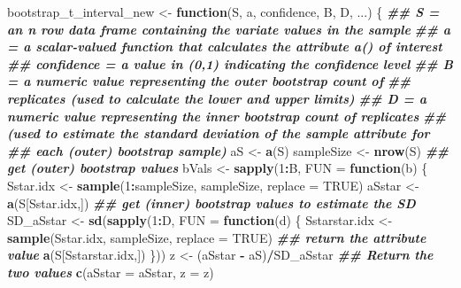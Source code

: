\documentclass[
]{article}
\newenvironment{Shaded}{\begin{snugshade}}{\end{snugshade}}
\newcommand{\AttributeTok}[1]{\textcolor[rgb]{0.13,0.29,0.53}{#1}}
\newcommand{\ConstantTok}[1]{\textcolor[rgb]{0.56,0.35,0.01}{#1}}
\newcommand{\ControlFlowTok}[1]{\textcolor[rgb]{0.13,0.29,0.53}{\textbf{#1}}}
\newcommand{\DecValTok}[1]{\textcolor[rgb]{0.00,0.00,0.81}{#1}}
\newcommand{\DocumentationTok}[1]{\textcolor[rgb]{0.56,0.35,0.01}{\textbf{\textit{#1}}}}
\newcommand{\FunctionTok}[1]{\textcolor[rgb]{0.13,0.29,0.53}{\textbf{#1}}}
\newcommand{\NormalTok}[1]{#1}
\newcommand{\OtherTok}[1]{\textcolor[rgb]{0.56,0.35,0.01}{#1}}
\newcommand{\SpecialCharTok}[1]{\textcolor[rgb]{0.81,0.36,0.00}{\textbf{#1}}}
\begin{document}
\newpage

\begin{Shaded}
\begin{Highlighting}[]
\NormalTok{bootstrap\_t\_interval\_new }\OtherTok{\textless{}{-}} \ControlFlowTok{function}\NormalTok{(S, a, confidence, B, D, ...) \{}
  \DocumentationTok{\#\#    S = an n row data frame containing the variate values in the sample }
  \DocumentationTok{\#\#    a = a scalar{-}valued function that calculates the attribute a() of interest }
  \DocumentationTok{\#\#    confidence = a value in (0,1) indicating the confidence level }
  \DocumentationTok{\#\#    B = a numeric value representing the outer bootstrap count of}
  \DocumentationTok{\#\#    replicates (used to calculate the lower and upper limits) }
  \DocumentationTok{\#\#    D = a numeric value representing the inner bootstrap count of replicates}
  \DocumentationTok{\#\#    (used to estimate the standard deviation of the sample attribute for}
  \DocumentationTok{\#\#    each (outer) bootstrap sample)}
\NormalTok{  aS }\OtherTok{\textless{}{-}} \FunctionTok{a}\NormalTok{(S)}
\NormalTok{  sampleSize }\OtherTok{\textless{}{-}} \FunctionTok{nrow}\NormalTok{(S)}
  \DocumentationTok{\#\# get (outer) bootstrap values}
\NormalTok{  bVals }\OtherTok{\textless{}{-}} \FunctionTok{sapply}\NormalTok{(}\DecValTok{1}\SpecialCharTok{:}\NormalTok{B, }\AttributeTok{FUN =} \ControlFlowTok{function}\NormalTok{(b) \{}
\NormalTok{    Sstar.idx }\OtherTok{\textless{}{-}} \FunctionTok{sample}\NormalTok{(}\DecValTok{1}\SpecialCharTok{:}\NormalTok{sampleSize, sampleSize, }\AttributeTok{replace =} \ConstantTok{TRUE}\NormalTok{)}
\NormalTok{    aSstar }\OtherTok{\textless{}{-}} \FunctionTok{a}\NormalTok{(S[Sstar.idx,])}
    \DocumentationTok{\#\# get (inner) bootstrap values to estimate the SD}
\NormalTok{    SD\_aSstar }\OtherTok{\textless{}{-}} \FunctionTok{sd}\NormalTok{(}\FunctionTok{sapply}\NormalTok{(}\DecValTok{1}\SpecialCharTok{:}\NormalTok{D, }\AttributeTok{FUN =} \ControlFlowTok{function}\NormalTok{(d) \{}
\NormalTok{      Sstarstar.idx }\OtherTok{\textless{}{-}} \FunctionTok{sample}\NormalTok{(Sstar.idx, sampleSize, }\AttributeTok{replace =} \ConstantTok{TRUE}\NormalTok{)}
      \DocumentationTok{\#\# return the attribute value}
      \FunctionTok{a}\NormalTok{(S[Sstarstar.idx,])}
\NormalTok{    \}))}
\NormalTok{    z }\OtherTok{\textless{}{-}}\NormalTok{ (aSstar }\SpecialCharTok{{-}}\NormalTok{ aS)}\SpecialCharTok{/}\NormalTok{SD\_aSstar}
    \DocumentationTok{\#\# Return the two values}
    \FunctionTok{c}\NormalTok{(}\AttributeTok{aSstar =}\NormalTok{ aSstar, }\AttributeTok{z =}\NormalTok{ z)}

\end{Highlighting}
\end{Shaded}
\end{document}
